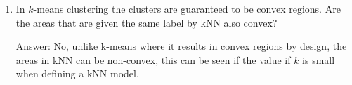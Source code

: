 \documentclass{article}
\newcommand{\gre}[1]{\textcolor{gre}{#1}}
\newcommand\ans[1]{\par\gre{Answer: #1}}
\begin{document}
\begin{enumerate}
        \item In $k$-means clustering the clusters are guaranteed to be convex regions. Are the areas that are given the same label by kNN also convex?

        \ans{No, unlike k-means where it results in convex regions by design, the areas in kNN can be non-convex, this can be seen if the value if $k$ is small when defining a kNN model.}
    \end{enumerate}
\end{document}
